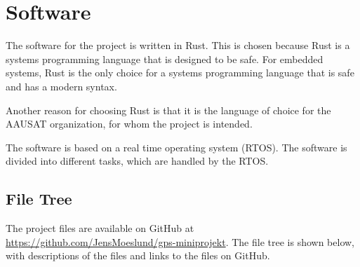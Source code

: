 \chapter{Software}\label{ch:system-development}
The software for the project is written in Rust.
This is chosen because Rust is a systems programming language that is designed to be safe.
For embedded systems, Rust is the only choice for a systems programming language that is safe and has a modern syntax.

Another reason for choosing Rust is that it is the language of choice for the AAUSAT organization, for whom the project is intended.

The software is based on a real time operating system (RTOS).
The software is divided into different tasks, which are handled by the RTOS.


\section{File Tree}
The project files are available on GitHub at \url{https://github.com/JensMoeslund/gps-miniprojekt}.
The file tree is shown below, with descriptions of the files and links to the files on GitHub.

